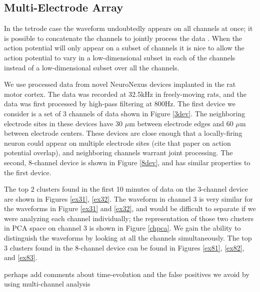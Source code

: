 \subsection{Multi-Electrode Array} \label{sub:multi}

In the tetrode case the waveform undoubtedly appears on all channels at once; it is possible to concatenate the channels to jointly process the data \cite{wood2009}.  When the action potential will only appear on a subset of channels it is nice to allow the action potential to vary in a low-dimensional subset in each of the channels instead of a low-dimensional subset over all the channels. \cite{Prentice2011}

We use processed data from novel NeuroNexus devices implanted in the rat motor cortex.  The data was recorded at 32.5kHz in freely-moving rats, and the data was first processed by high-pass filtering at 800Hz.  The first device we consider is a set of 3 channels of data shown in Figure \ref{3dev}.  The neighboring electrode sites in these devices have 30 $\mu$m between electrode edges and 60 $\mu$m between electrode centers.  These devices are close enough that a locally-firing neuron could appear on multiple electrode sites (cite that paper on action potential overlap), and neighboring channels warrant joint processing.  The second, 8-channel device is shown in Figure \ref{8dev}, and has similar properties to the first device.

 The top 2 clusters found in the first 10 minutes of data on the 3-channel device are shown in Figures \ref{ex31}, \ref{ex32}.  The waveform in channel 3 is very similar for the waveforms in Figure \ref{ex31} and \ref{ex32}, and would be difficult to separate if we were analyzing each channel individually; the representation of those two clusters in PCA space on channel 3 is shown in Figure \ref{chpca}.  We gain the ability to distinguish the waveforms by looking at all the channels simultaneously.  The top 3 clusters found in the 8-channel device can be found in Figures \ref{ex81}, \ref{ex82}, and \ref{ex83}.

{\color{red} perhaps add comments about time-evolution and the false positives we avoid by using multi-channel analysis}


